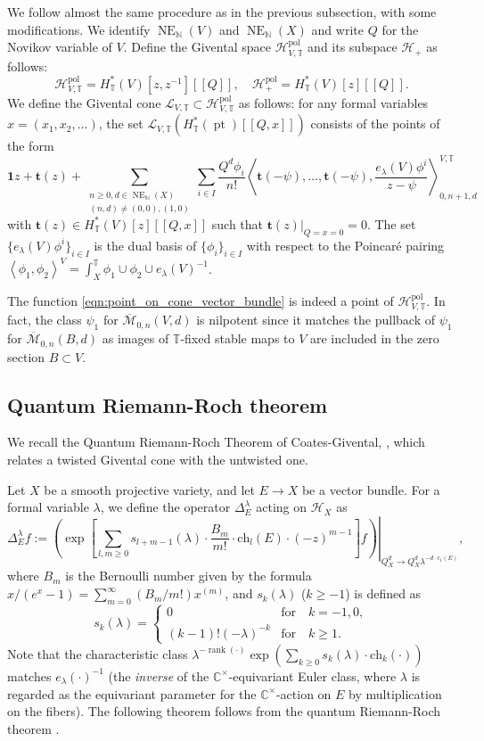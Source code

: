\documentclass[a4paper,12pt]{amsart}
\numberwithin{equation}{section}
\theoremstyle{definition}
\newcommand{\C}{\mathbb{C}}
\newcommand{\N}{\mathbb{N}}
\newcommand{\T}{\mathbb{T}}
\newcommand{\bone}{\mathbf{1}}
\newcommand{\bt}{\mathbf{t}}
\newcommand{\cH}{\mathcal{H}}
\newcommand{\cL}{\mathcal{L}}
\newcommand{\cM}{\mathcal{M}}
\newcommand{\ovcM}{\overline{\cM}}
\newcommand{\pol}{{\operatorname{pol}}}
\newcommand{\pt}{\operatorname{pt}}
\newcommand{\rank}{\operatorname{rank}}
\newcommand{\NE}{\operatorname{NE}_{\N}}
\def\corr#1{\left\langle#1 \right\rangle}
\begin{document}
We follow almost the same procedure as in the previous subsection, with some modifications.
We identify $\NE(V)$ and $\NE(X)$ and write $Q$ for the Novikov variable of $V$.
Define the Givental space $\cH_{V,\T}^\pol$ and its subspace $\cH_+$ as follows:
\[
\cH_{V,\T}^\pol=H^*_\T(V)[z,z^{-1}][\![Q]\!],\quad\cH_+^\pol=H^*_\T(V)[z][\![Q]\!].
\]
We define the Givental cone $\cL_{V,\T}\subset\cH_{V,\T}^\pol$ as follows: for any formal variables $x=(x_1,x_2,\dots)$, the set $\cL_{V,\T}(H^*_\T(\pt)[\![Q,x]\!])$ consists of the points of the form
\begin{equation}\label{eqn:point_on_cone_vector_bundle}
\bone z + \bt(z) + \sum_{ \substack{n\geq0,d\in\NE(X) \\ (n,d)\neq(0,0),(1,0)} } \sum_{i\in I} \frac{Q^d\phi_i}{n!} \corr{\bt(-\psi),\dots,\bt(-\psi),\frac{e_\lambda(V)\phi^i}{z-\psi}}^{V,\T}_{0,n+1,d}
\end{equation}
with $\bt(z)\in H^*_\T(V)[z][\![Q,x]\!]$ such that $\bt(z)|_{Q=x=0}=0$.
The set $\{e_\lambda(V)\phi^i\}_{i\in I}$ is the dual basis of $\{\phi_i\}_{i\in I}$ with respect to the Poincar\'{e} pairing $\corr{\phi_1,\phi_2}^V = \int_X^\T\phi_1\cup\phi_2\cup e_\lambda(V)^{-1}$.

The function \eqref{eqn:point_on_cone_vector_bundle} is indeed a point of $\cH_{V,\T}^\pol$.
In fact, the class $\psi_1$ for $\ovcM_{0,n}(V,d)$ is nilpotent since it matches the pullback of $\psi_1$ for $\ovcM_{0,n}(B,d)$ as images of $\T$-fixed stable maps to $V$ are included in the zero section $B\subset V$.




\subsection{Quantum Riemann-Roch theorem}
We recall the Quantum Riemann-Roch Theorem of Coates-Givental, \cite{CG:quantum}, which relates a twisted Givental cone with the untwisted one.

Let $X$ be a smooth projective variety, and let $E\to X$ be a vector bundle.
For a formal variable $\lambda$, we define the operator $\Delta_E^\lambda$ acting on $\cH_X$ as
\[
\Delta_E^\lambda f := \left. \left( \exp\left[ \sum_{l,m\geq0} s_{l+m-1}(\lambda) \cdot \frac{B_m}{m!} \cdot \mathrm{ch}_l(E) \cdot (-z)^{m-1} \right] f \right) \right|_{Q_X^d\to Q_X^d\lambda^{-d\cdot c_1(E)}},
\]
where $B_m$ is the Bernoulli number given by the formula $x/(e^x-1)=\sum_{m=0}^\infty(B_m/m!)x^{(m)}$, and $s_k(\lambda)$ ($k\geq-1$) is defined as
\[
s_k(\lambda) = 
\begin{cases}
    0   &\text{for}\quad k=-1,0,  \\
    (k-1)!(-\lambda)^{-k} &\text{for}\quad k\geq1.
\end{cases}
\]
Note that the characteristic class $\lambda^{-\rank(\cdot)}\exp(\sum_{k\geq0}s_k(\lambda)\cdot\mathrm{ch}_k(\cdot))$ matches $e_\lambda(\cdot)^{-1}$ (the {\em inverse} of the $\C^\times$-equivariant Euler class, where $\lambda$ is regarded as the equivariant parameter for the $\C^\times$-action on $E$ by multiplication on the fibers).
The following theorem follows from the quantum Riemann-Roch theorem \cite[Corollary 4]{CG:quantum}. 
\end{document}
